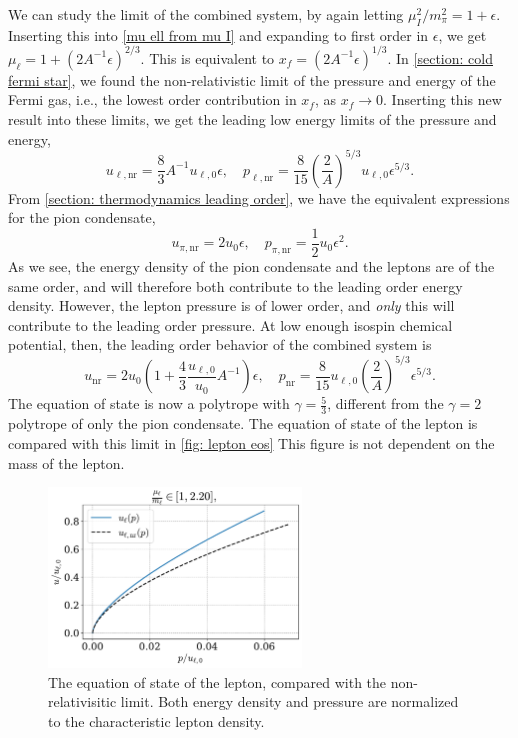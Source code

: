 We can study the limit of the combined system, by again letting $\mu_I^2/m_\pi^2 = 1 + \epsilon$.
Inserting this into \autoref{mu ell from mu I} and expanding to first order in $\epsilon$, we get $\mu_\ell = 1 + (2 A^{-1} \epsilon)^{2/3} $.
This is equivalent to $x_f = (2 A^{-1} \epsilon)^{1/3} $.
In \autoref{section: cold fermi star}, we found the non-relativistic limit of the pressure and energy of the Fermi gas, i.e., the lowest order contribution in $x_f$, as $x_f \rightarrow 0$.
Inserting this new result into these limits, we get the leading low energy limits of the pressure and energy, 
%
\begin{equation}
    u_{\ell, \text{nr}} = \frac{8}{3} A^{-1} u_{\ell,0} \epsilon, \quad
    p_{\ell, \text{nr}} = \frac{8}{15} \left(\frac{2}{A} \right)^{5/3}  u_{\ell,0}  \epsilon^{5/3}.
\end{equation}
%
From \autoref{section: thermodynamics leading order}, we have the equivalent expressions for the pion condensate,
%
\begin{equation}
    u_{\pi, \text{nr}} = 2 u_0 \epsilon, \quad p_{\pi, \text{nr}} = \frac{1}{2} u_0 \epsilon^2.
\end{equation}
%
As we see, the energy density of the pion condensate and the leptons are of the same order, and will therefore both contribute to the leading order energy density.
However, the lepton pressure is of lower order, and \emph{only} this will contribute to the leading order pressure.
At low enough isospin chemical potential, then, the leading order behavior of the combined system is
%
\begin{equation}
    u_{\text{nr}} = 2 u_0 \left(1+ \frac{4}{3} \frac{u_{\ell,0}}{u_0} A^{-1} \right)\epsilon ,\quad
    p_{\text{nr}} = \frac{8}{15} u_{\ell,0} \left(\frac{2}{A} \right)^{5/3} \epsilon^{5/3}.
\end{equation}
%
The equation of state is now a polytrope with $\gamma = \frac{5}{3}$, different from the $\gamma = 2$ polytrope of only the pion condensate.
The equation of state of the lepton is compared with this limit in \autoref{fig: lepton eos}
This figure is not dependent on the mass of the lepton.

\begin{figure}
    \centering
    \includegraphics[width=0.6\textwidth]{../scripts/figurer/charge_neutrality/eos_lepton.pdf}
    \caption{The equation of state of the lepton, compared with the non-relativisitic limit.
    Both energy density and pressure are normalized to the characteristic lepton density.}
    \label{fig: lepton eos}
\end{figure}


